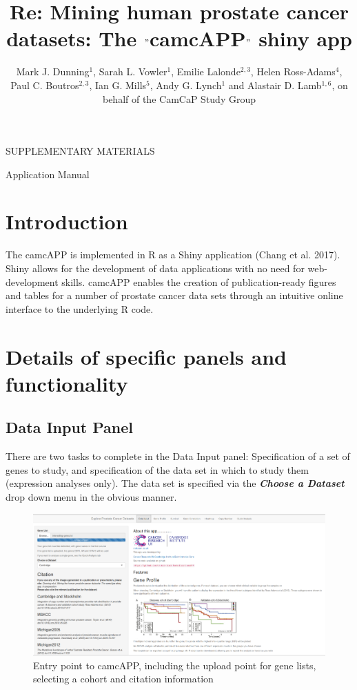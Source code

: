 \documentclass[]{article}
\title{Re: Mining human prostate cancer datasets: The \("\)camcAPP\("\) shiny
app}
\author{Mark J. Dunning\(^1\), Sarah L. Vowler\(^1\), Emilie Lalonde\(^{2,3}\),
Helen Ross-Adams\(^4\), Paul C. Boutros\(^{2,3}\), Ian G. Mills\(^5\),
Andy G. Lynch\(^1\) and Alastair D. Lamb\(^{1,6}\), on behalf of the
CamCaP Study Group}
\date{}
\begin{document}
SUPPLEMENTARY MATERIALS

Application Manual


{\let\newpage\relax\maketitle}

\section{Introduction}\label{introduction}

The camcAPP is implemented in R as a Shiny application (Chang et al.
2017). Shiny allows for the development of data applications with no
need for web-development skills. camcAPP enables the creation of
publication-ready figures and tables for a number of prostate cancer
data sets through an intuitive online interface to the underlying R
code.

\section{Details of specific panels and
functionality}\label{details-of-specific-panels-and-functionality}

\subsection{Data Input Panel}\label{data-input-panel}

There are two tasks to complete in the Data Input panel: Specification
of a set of genes to study, and specification of the data set in which
to study them (expression analyses only). The data set is specified via
the \textbf{\emph{Choose a Dataset}} drop down menu in the obvious
manner.

\begin{figure}[htbp]
\centering
\includegraphics{Figure1.png}
\caption{Entry point to camcAPP, including the upload point for gene
lists, selecting a cohort and citation information}
\end{figure}
\end{document}
